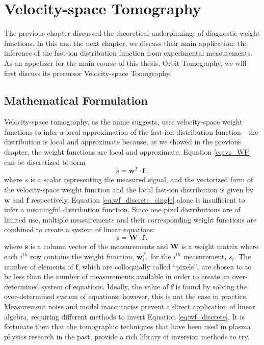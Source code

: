 \chapter{Velocity-space Tomography}\label{chap:velocity-space_tomography}

The previous chapter discussed the theoretical underpinnings of diagnostic weight functions. In this and the next chapter, we discuss their main application: the inference of the fast-ion distribution function from experimental measurements. As an appetizer for the main course of this thesis, Orbit Tomography, we will first discuss its precursor Velocity-space Tomography.

\section{Mathematical Formulation}
Velocity-space tomography, as the name suggests, uses velocity-space weight functions to infer a local approximation of the fast-ion distribution function---the distribution is local and approximate because, as we showed in the previous chapter, the weight functions are local and approximate.
Equation \ref{eq:vs_WF} can be discretized to form
\begin{equation} \label{eq:wf_discrete_single}
    s = \mathbf{w}^T \cdot \mathbf{f}\,,
\end{equation}
where $s$ is a scalar representing the measured signal, and the vectorized form of the velocity-space weight function and the local fast-ion distribution is given by $\mathbf{w}$ and $\mathbf{f}$ respectively. Equation \ref{eq:wf_discrete_single} alone is insufficient to infer a meaningful distribution function.
Since one pixel distributions are of limited use, multiple measurements and their corresponding weight functions are combined to create a system of linear equations:
\begin{equation}\label{eq:wf_discrete}
    \mathbf{s} = \mathbf{W}\cdot\mathbf{f}\,,
\end{equation}
where $\mathbf{s}$ is a column vector of the measurements and $\mathbf{W}$ is a weight matrix where each $i^{th}$ row contains the weight function, $\mathbf{w}_i^T$, for the $i^{th}$ measurement, $s_i$. 
The number of elements of $\mathbf{f}$, which are colloquially called ``pixels'', are chosen to to be less than the number of measurements available in order to create an over-determined system of equations. 
Ideally, the value of $\mathbf{f}$ is found by solving the over-determined system of equations; however, this is not the case in practice. Measurement noise and model inaccuracies prevent a direct application of linear algebra, requiring different methods to invert Equation \ref{eq:wf_discrete}. It is fortunate then that the tomographic techniques that have been used in plasma physics research in the past, provide a rich library of inversion methods to try.\cite{nagayama1981soft,koslover1986measurement,mcwilliams1987laboratory,reinhold1990excitation,Anton1996,zimmerman2005two,svensson2008current,odstrcil2012modern}

